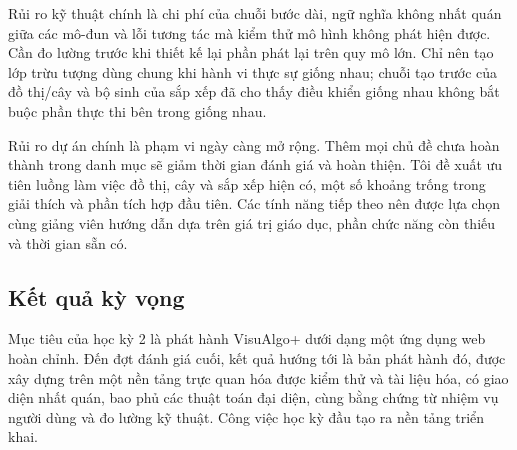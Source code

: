 \documentclass[11pt,a4paper]{article}
\begin{document}
Rủi ro kỹ thuật chính là chi phí của chuỗi bước dài, ngữ nghĩa không nhất quán giữa các mô-đun và lỗi tương tác mà kiểm thử mô hình không phát hiện được. Cần đo lường trước khi thiết kế lại phần phát lại trên quy mô lớn. Chỉ nên tạo lớp trừu tượng dùng chung khi hành vi thực sự giống nhau; chuỗi tạo trước của đồ thị/cây và bộ sinh của sắp xếp đã cho thấy điều khiển giống nhau không bắt buộc phần thực thi bên trong giống nhau.

Rủi ro dự án chính là phạm vi ngày càng mở rộng. Thêm mọi chủ đề chưa hoàn thành trong danh mục sẽ giảm thời gian đánh giá và hoàn thiện. Tôi đề xuất ưu tiên luồng làm việc đồ thị, cây và sắp xếp hiện có, một số khoảng trống trong giải thích và phần tích hợp đầu tiên. Các tính năng tiếp theo nên được lựa chọn cùng giảng viên hướng dẫn dựa trên giá trị giáo dục, phần chức năng còn thiếu và thời gian sẵn có.

\subsection{Kết quả kỳ vọng}
Mục tiêu của học kỳ 2 là phát hành VisuAlgo+ dưới dạng một ứng dụng web hoàn chỉnh. Đến đợt đánh giá cuối, kết quả hướng tới là bản phát hành đó, được xây dựng trên một nền tảng trực quan hóa được kiểm thử và tài liệu hóa, có giao diện nhất quán, bao phủ các thuật toán đại diện, cùng bằng chứng từ nhiệm vụ người dùng và đo lường kỹ thuật. Công việc học kỳ đầu tạo ra nền tảng triển khai.

\page
{}
\begingroup\small\raggedright


\endgroup


\end{document}
